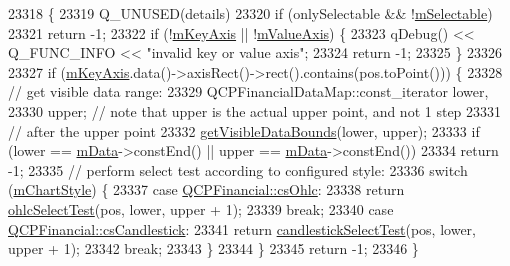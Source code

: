 \begin{DoxyCode}
23318                                                          \{
23319   Q\_UNUSED(details)
23320   if (onlySelectable && !\hyperlink{class_q_c_p_abstract_plottable_aceee52342c8e75727abcbd164986fdcb}{mSelectable})
23321     return -1;
23322   if (!\hyperlink{class_q_c_p_abstract_plottable_a426f42e254d0f8ce5436a868c61a6827}{mKeyAxis} || !\hyperlink{class_q_c_p_abstract_plottable_a2901452ca4aea911a1827717934a4bda}{mValueAxis}) \{
23323     qDebug() << Q\_FUNC\_INFO << \textcolor{stringliteral}{"invalid key or value axis"};
23324     \textcolor{keywordflow}{return} -1;
23325   \}
23326 
23327   \textcolor{keywordflow}{if} (\hyperlink{class_q_c_p_abstract_plottable_a426f42e254d0f8ce5436a868c61a6827}{mKeyAxis}.data()->axisRect()->rect().contains(pos.toPoint())) \{
23328     \textcolor{comment}{// get visible data range:}
23329     QCPFinancialDataMap::const\_iterator lower,
23330         upper; \textcolor{comment}{// note that upper is the actual upper point, and not 1 step}
23331                \textcolor{comment}{// after the upper point}
23332     \hyperlink{class_q_c_p_financial_aca2edf9f19fae733cdb6bd4549019b84}{getVisibleDataBounds}(lower, upper);
23333     \textcolor{keywordflow}{if} (lower == \hyperlink{class_q_c_p_financial_a475f63587ca1077d8c30aaf2b71ae026}{mData}->constEnd() || upper == \hyperlink{class_q_c_p_financial_a475f63587ca1077d8c30aaf2b71ae026}{mData}->constEnd())
23334       \textcolor{keywordflow}{return} -1;
23335     \textcolor{comment}{// perform select test according to configured style:}
23336     \textcolor{keywordflow}{switch} (\hyperlink{class_q_c_p_financial_ab65c2ce8d6354451870bb44b894c1e92}{mChartStyle}) \{
23337     \textcolor{keywordflow}{case} \hyperlink{class_q_c_p_financial_a0f800e21ee98d646dfc6f8f89d10ebfba3a516016c9298d3e95dd82aa203c4390}{QCPFinancial::csOhlc}:
23338       \textcolor{keywordflow}{return} \hyperlink{class_q_c_p_financial_a9c7d79351e728a67bfb6821c1d1bd6c0}{ohlcSelectTest}(pos, lower, upper + 1);
23339       \textcolor{keywordflow}{break};
23340     \textcolor{keywordflow}{case} \hyperlink{class_q_c_p_financial_a0f800e21ee98d646dfc6f8f89d10ebfbac803cbd39f26e3f206bcc7028679e62f}{QCPFinancial::csCandlestick}:
23341       \textcolor{keywordflow}{return} \hyperlink{class_q_c_p_financial_abd0137244a17d5486a01ee442b083333}{candlestickSelectTest}(pos, lower, upper + 1);
23342       \textcolor{keywordflow}{break};
23343     \}
23344   \}
23345   \textcolor{keywordflow}{return} -1;
23346 \}
\end{DoxyCode}


